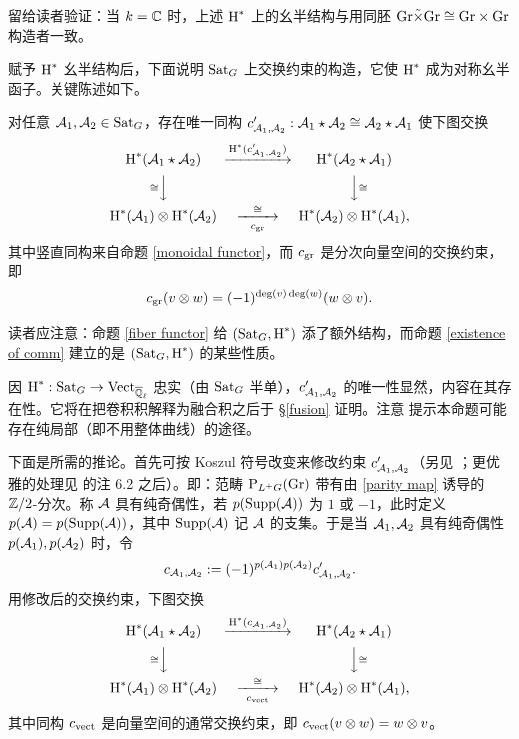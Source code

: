 留给读者验证：当 $k={\mathbb C}$ 时，上述 $\operatorname{H}^*$ 上的幺半结构与用同胚 ${\operatorname{Gr}}\tilde\times{\operatorname{Gr}}\cong {\operatorname{Gr}}\times {\operatorname{Gr}}$ 构造者一致。

赋予 $\operatorname{H}^*$ 幺半结构后，下面说明 ${\operatorname{Sat}}_G$ 上交换约束的构造，它使 $\operatorname{H}^*$ 成为对称幺半函子。关键陈述如下。

\begin{prop}\label{existence of comm}
对任意 ${\mathcal A}_1,{\mathcal A}_2\in{\operatorname{Sat}}_G$，存在唯一同构 $c'_{{\mathcal A}_1,{\mathcal A}_2}:{\mathcal A}_1\star{\mathcal A}_2\cong{\mathcal A}_2\star{\mathcal A}_1$ 使下图交换
\[\begin{CD}
\on{H}^*(\mA_1\star\mA_2)@>\on{H}^*(c'_{\mA_1,\mA_2})>>\on{H}^*(\mA_2\star\mA_1)\\
@V\cong VV@VV\cong V\\
\on{H}^*(\mA_1)\otimes\on{H}^*(\mA_2)@>\cong>c_{\on{gr}}>\on{H}^*(\mA_2)\otimes\on{H}^*(\mA_1),
\end{CD}\]
其中竖直同构来自命题 \ref{monoidal functor}，而 $c_{\operatorname{gr}}$ 是分次向量空间的交换约束，即
\[c_{\operatorname{gr}}(v\otimes w)=(-1)^{\deg(v)\deg(w)}(w\otimes v).\]
\end{prop}

\begin{rmk}
读者应注意：命题 \ref{fiber functor} 给 $({\operatorname{Sat}}_G, \operatorname{H}^*)$ 添了额外结构，而命题 \ref{existence of comm} 建立的是 $({\operatorname{Sat}}_G,\operatorname{H}^*)$ 的某些性质。
\end{rmk}

因 $\operatorname{H}^*:{\operatorname{Sat}}_G\to\operatorname{Vect}_{{\overline{{\mathbb Q}}_\ell}}$ 忠实（由 ${\operatorname{Sat}}_G$ 半单），$c'_{{\mathcal A}_1,{\mathcal A}_2}$ 的唯一性显然，内容在其存在性。它将在把卷积积解释为融合积之后于 \S\ref{fusion} 证明。注意 \cite[\S~2.4]{Z14} 提示本命题可能存在纯局部（即不用整体曲线）的途径。

下面是所需的推论。首先可按 Koszul 符号改变来修改约束 $c'_{{\mathcal A}_1,{\mathcal A}_2}$（另见 \cite[\S~5.3.21]{BD}；更优雅的处理见 \cite{MV} 的注 6.2 之后）。即：范畴 $\operatorname{P}_{L^+G}({\operatorname{Gr}})$ 带有由 \eqref{parity map} 诱导的 ${\mathbb Z}/2$-分次。称 ${\mathcal A}$ 具有纯奇偶性，若 $p(\operatorname{Supp}({\mathcal A}))$ 为 $1$ 或 $-1$，此时定义 $p({\mathcal A})=p(\operatorname{Supp}({\mathcal A}))$，其中 $\operatorname{Supp}({\mathcal A})$ 记 ${\mathcal A}$ 的支集。于是当 ${\mathcal A}_1,{\mathcal A}_2$ 具有纯奇偶性 $p({\mathcal A}_1),p({\mathcal A}_2)$ 时，令
\begin{equation}\label{koszul sign change}
c_{{\mathcal A}_1,{\mathcal A}_2}:=(-1)^{p({\mathcal A}_1)p({\mathcal A}_2)}c'_{{\mathcal A}_1,{\mathcal A}_2}.
\end{equation}
用修改后的交换约束，下图交换
\[\begin{CD}
\on{H}^*(\mA_1\star\mA_2)@>\on{H}^*(c_{\mA_1,\mA_2})>>\on{H}^*(\mA_2\star\mA_1)\\
@V\cong VV@VV\cong V\\
\on{H}^*(\mA_1)\otimes\on{H}^*(\mA_2)@>\cong>c_{\on{vect}}>\on{H}^*(\mA_2)\otimes\on{H}^*(\mA_1),
\end{CD}\]
其中同构 $c_{\operatorname{vect}}$ 是向量空间的通常交换约束，即 $c_{\operatorname{vect}}(v\otimes w)=w\otimes v$。

